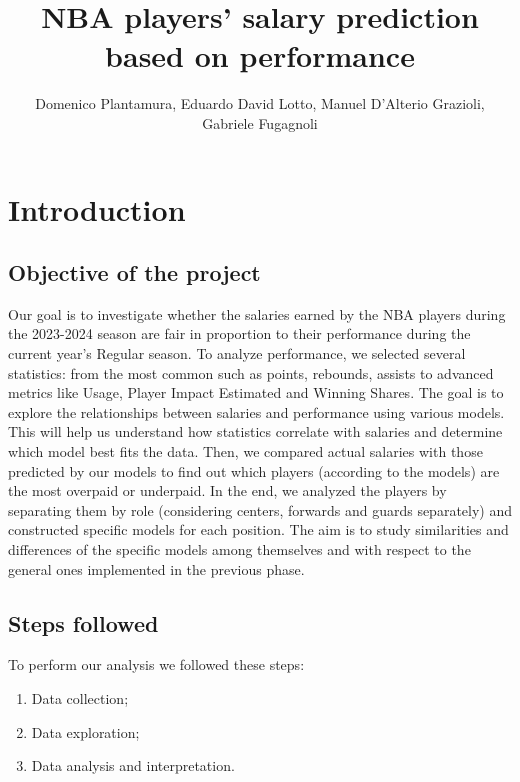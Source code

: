 \documentclass[
]{article}
\title{NBA players' salary prediction based on performance}
\author{Domenico Plantamura, Eduardo David Lotto, Manuel D'Alterio
Grazioli, Gabriele Fugagnoli}
\date{}
\begin{document}
\maketitle

{
\setcounter{tocdepth}{2}
\tableofcontents
}
\hfill\break

\hypertarget{introduction}{%
\section{Introduction}\label{introduction}}

\hypertarget{objective-of-the-project}{%
\subsection{Objective of the project}\label{objective-of-the-project}}

Our goal is to investigate whether the salaries earned by the NBA
players during the 2023-2024 season are fair in proportion to their
performance during the current year's Regular season. To analyze
performance, we selected several statistics: from the most common such
as points, rebounds, assists to advanced metrics like Usage, Player
Impact Estimated and Winning Shares. The goal is to explore the
relationships between salaries and performance using various models.
This will help us understand how statistics correlate with salaries and
determine which model best fits the data. Then, we compared actual
salaries with those predicted by our models to find out which players
(according to the models) are the most overpaid or underpaid. In the
end, we analyzed the players by separating them by role (considering
centers, forwards and guards separately) and constructed specific models
for each position. The aim is to study similarities and differences of
the specific models among themselves and with respect to the general
ones implemented in the previous phase.

\hypertarget{steps-followed}{%
\subsection{Steps followed}\label{steps-followed}}

To perform our analysis we followed these steps:

\begin{enumerate}
\def\labelenumi{\arabic{enumi}.}
\item
  Data collection;
\item
  Data exploration;
\item
  Data analysis and interpretation.
\end{enumerate}
\end{document}

